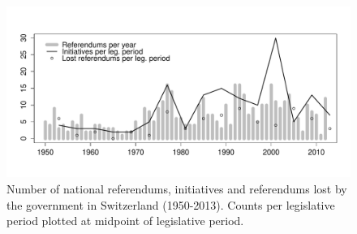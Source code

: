 \documentclass[11pt,a4paper]{article}
\begin{document}
\begin{figure}[htb]
\includegraphics[width=\textwidth]{../../figures/figure.pdf}    
\caption{Number of national referendums, initiatives and referendums lost by the government in Switzerland (1950-2013). Counts per legislative period plotted at midpoint of legislative period.}\label{fig}
\end{figure}
\end{document}
